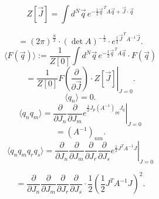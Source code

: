 

\[
Z[\vec J]
=\int d^N\vec q\,
e^{-\frac{1}{2}\vec q^{\,T}A\vec q+\vec J\cdot\vec q}
\]
\begin{center}
\end{center}
\[
=(2\pi)^{\frac{N}{2}}\cdot(\det A)^{-\frac{1}{2}}\cdot
e^{\frac{1}{2}\vec J^{\,T}A^{-1}\vec J}.
\]
\[
\langle F(\vec q)\rangle:=
\frac{1}{Z[0]}\int d^N\vec q\,
e^{-\frac{1}{2}\vec q^{\,T}A\vec q}\cdot F(\vec q)
\]
\[
=\left.\frac{1}{Z[0]}
F\left(\frac{\partial}{\partial\vec J}\right)\cdot Z[\vec J]
\right|_{J=0}.
\]
\[
\langle q_n\rangle=0.
\]
\[
\langle q_nq_m\rangle
=\left.\frac{\partial}{\partial J_n}
\frac{\partial}{\partial J_m}
e^{\frac{1}{2}J_p(A^{-1})_{pq}J_q}\right|_{J=0}
\]
\[
=(A^{-1})_{nm}.
\]
\[
\langle q_nq_mq_rq_s\rangle
=\left.\frac{\partial}{\partial J_n}
\frac{\partial}{\partial J_m}
\frac{\partial}{\partial J_r}
\frac{\partial}{\partial J_s}
e^{\frac{1}{2}J^T A^{-1}J}\right|_{J=0}
\]



\[
=\frac{\partial}{\partial J_n}
\frac{\partial}{\partial J_m}
\frac{\partial}{\partial J_r}
\frac{\partial}{\partial J_s}\cdot
\frac{1}{2}\left(\frac{1}{2}J^T A^{-1}J\right)^2.
\]

